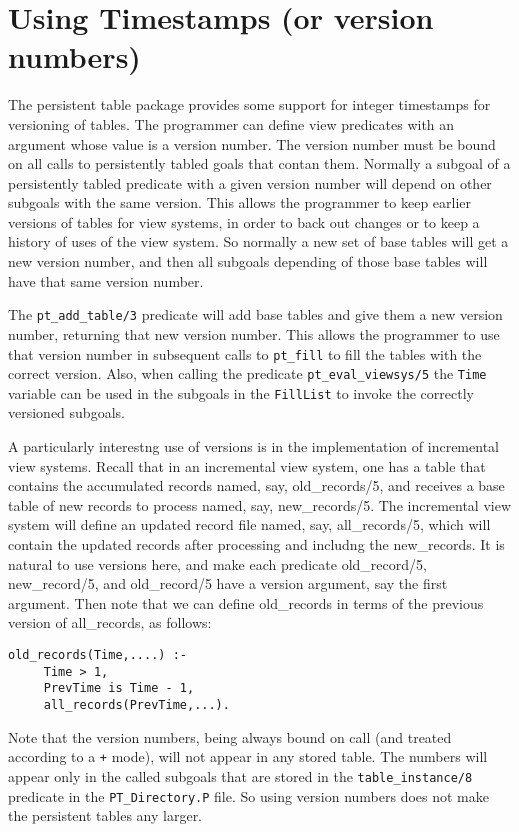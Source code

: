 \section{Using Timestamps (or version numbers)}

The persistent table package provides some support for integer
timestamps for versioning of tables.  The programmer can define view
predicates with an argument whose value is a version number.  The
version number must be bound on all calls to persistently tabled goals
that contan them.  Normally a subgoal of a persistently tabled
predicate with a given version number will depend on other subgoals
with the same version.  This allows the programmer to keep earlier
versions of tables for view systems, in order to back out changes or
to keep a history of uses of the view system.  So normally a new set
of base tables will get a new version number, and then all subgoals
depending of those base tables will have that same version number.

The {\tt pt\_add\_table/3} predicate will add base tables and give them
a new version number, returning that new version number.  This allows
the programmer to use that version number in subsequent calls to
{\tt pt\_fill} to fill the tables with the correct version.  Also,
when calling the predicate {\tt pt\_eval\_viewsys/5} the {\tt Time}
variable can be used in the subgoals in the {\tt FillList} to invoke
the correctly versioned subgoals.

A particularly interestng use of versions is in the implementation of
incremental view systems.  Recall that in an incremental view system,
one has a table that contains the accumulated records named, say,
old\_records/5, and receives a base table of new records to process
named, say, new\_records/5.  The incremental view system will define an
updated record file named, say, all\_records/5, which will contain the
updated records after processing and includng the new\_records.  It is
natural to use versions here, and make each predicate old\_record/5,
new\_record/5, and old\_record/5 have a version argument, say the first
argument.  Then note that we can define old\_records in terms of the
previous version of all\_records, as follows:

\begin{verbatim}
old_records(Time,....) :-
     Time > 1,
     PrevTime is Time - 1,
     all_records(PrevTime,...).
\end{verbatim}

Note that the version numbers, being always bound on call (and treated
according to a {\tt +} mode), will not appear in any stored table.  The
numbers will appear only in the called subgoals that are stored in the
{\tt table\_instance/8} predicate in the {\tt PT\_Directory.P} file.
So using version numbers does not make the persistent tables any
larger.

